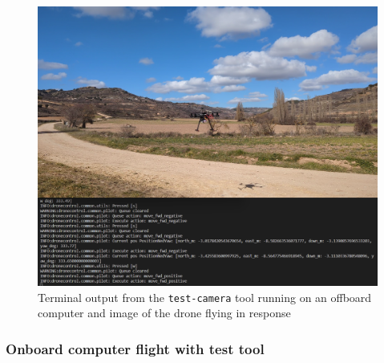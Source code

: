 \begin{figure}
  \centering
  \includegraphics[width=\textwidth, keepaspectratio]{img/video-field-test-offboard.png}
  \caption{Terminal output from the \texttt{test-camera} tool running on an offboard computer and image of the drone flying in response}
  \label{fig:flight-test-cam-offboard}
\end{figure}

\subsubsection{Onboard computer flight with test tool}
\label{subsec:fl-test-3}

